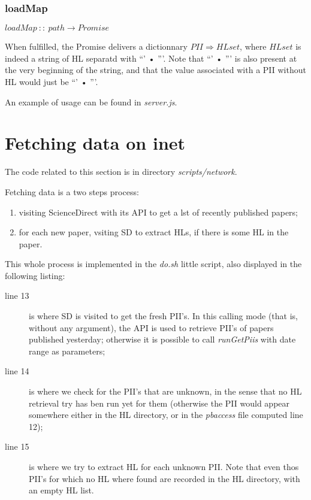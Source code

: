 \documentclass[a4paper,11pt]{report}
\begin{document}
\subsubsection{loadMap}
$
loadMap\ ::\ path\rightarrow Promise 
$

When fulfilled, the Promise delivers a dictionnary $PII\Rightarrow HLset$, where $HLset$ is indeed a string of HL separatd with ``' • '''. Note that ``' • ''' is also present at the very beginning of the string, and that the value associated with a PII without HL would just be ``' • '''.

An example of usage can be found in \emph{server.js}.

\section{Fetching data on inet}\label{fetchinginet}
The code related to this section is in directory \emph{scripts/network}.

Fetching data is a two steps process:
\begin{enumerate}
\item visiting ScienceDirect with its API to get a lst of recently published papers;
\item for each new paper, vsiting SD to extract HLs, if there is some HL in the paper.
\end{enumerate}


This whole process is implemented in the \emph{do.sh} little script, also displayed in the following listing:


\begin{description}
\item[line 13] is where SD is visited to get the fresh PII's. In this calling mode (that is, without any argument), the API is used to retrieve PII's of papers published yesterday; otherwise it is possible to call \emph{runGetPiis} with date range as parameters;
\item[line 14] is where we check for the PII's that are unknown, in the sense that no HL retrieval try has ben run yet for them (otherwise the PII would appear somewhere either in the HL directory, or in the \emph{pbaccess} file computed line 12);
\item[line 15] is where we try to extract HL for each unknown PII. Note that even thos PII's for which no HL where found are recorded in the HL directory, with an empty HL list.
\end{description}
\end{document}
